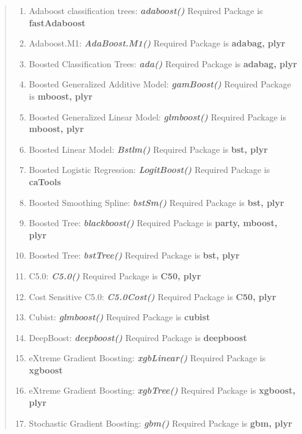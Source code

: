 \documentclass[11pt]{article}
\providecommand{\tightlist}{%
      \setlength{\itemsep}{0pt}\setlength{\parskip}{0pt}}
\begin{document}
\begin{quote}
\begin{enumerate}
\def\labelenumi{\arabic{enumi}.}
\tightlist
\item
  Adaboost classification trees: \textbf{\emph{adaboost()}} Required
  Package is \textbf{fastAdaboost}
\item
  Adaboost.M1: \textbf{\emph{AdaBoost.M1()}} Required Package is
  \textbf{adabag, plyr}
\item
  Boosted Classification Trees: \textbf{\emph{ada()}} Required Package
  is \textbf{adabag, plyr}
\item
  Boosted Generalized Additive Model: \textbf{\emph{gamBoost()}}
  Required Package is \textbf{mboost, plyr}
\item
  Boosted Generalized Linear Model: \textbf{\emph{glmboost()}} Required
  Package is \textbf{mboost, plyr}
\item
  Boosted Linear Model: \textbf{\emph{Bstlm()}} Required Package is
  \textbf{bst, plyr}
\item
  Boosted Logistic Regression: \textbf{\emph{LogitBoost()}} Required
  Package is \textbf{caTools}
\item
  Boosted Smoothing Spline: \textbf{\emph{bstSm()}} Required Package is
  \textbf{bst, plyr}
\item
  Boosted Tree: \textbf{\emph{blackboost()}} Required Package is
  \textbf{party, mboost, plyr}
\item
  Boosted Tree: \textbf{\emph{bstTree()}} Required Package is
  \textbf{bst, plyr}
\item
  C5.0: \textbf{\emph{C5.0()}} Required Package is \textbf{C50, plyr}
\item
  Cost Sensitive C5.0: \textbf{\emph{C5.0Cost()}} Required Package is
  \textbf{C50, plyr}
\item
  Cubist: \textbf{\emph{glmboost()}} Required Package is \textbf{cubist}
\item
  DeepBoost: \textbf{\emph{deepboost()}} Required Package is
  \textbf{deepboost}
\item
  eXtreme Gradient Boosting: \textbf{\emph{xgbLinear()}} Required
  Package is \textbf{xgboost}
\item
  eXtreme Gradient Boosting: \textbf{\emph{xgbTree()}} Required Package
  is \textbf{xgboost, plyr}
\item
  Stochastic Gradient Boosting: \textbf{\emph{gbm()}} Required Package
  is \textbf{gbm, plyr}
\end{enumerate}
\end{quote}
\end{document}
